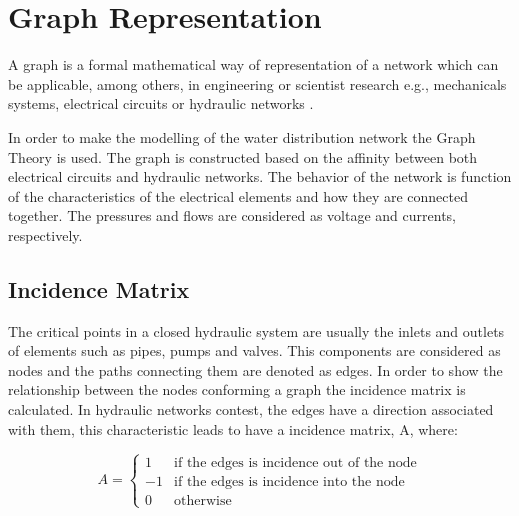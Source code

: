 \section{Graph Representation}  
\label{GraphTheory}
A graph is a formal mathematical way of representation of a network which can be applicable, among others, 
in engineering or scientist research e.g., mechanicals systems, electrical circuits or hydraulic networks \cite{graph_intro}. 

In order to make the modelling of the water distribution network the Graph Theory is used. The graph is constructed 
based on the affinity between both electrical circuits and hydraulic networks. 
The behavior of the network is function of the characteristics of the 
electrical elements and how they are connected together. The pressures and flows are considered as 
voltage and currents, respectively.

\subsection{Incidence Matrix} 

The critical points in a closed hydraulic system are usually the inlets and outlets of elements such as pipes, pumps and valves. 
This components are considered as nodes and the paths connecting them are denoted as edges. 
In order to show the relationship between the nodes conforming a graph the 
incidence matrix is calculated. In hydraulic networks contest, the edges have a 
direction associated with them, this characteristic leads to have a incidence matrix, A, where:

\begin{equation}
\label{DiGraph}
 A =
		\left\{
		\begin{array}{ll}
		
		1 			&      \text{if the edges is incidence out of the node}	
\\
		-1                       &     \text{if the edges is incidence into the node}
\\

                0                       &      \text{otherwise}

		\end{array}
		\right.
\end{equation}	


 
%
%

 
 
 